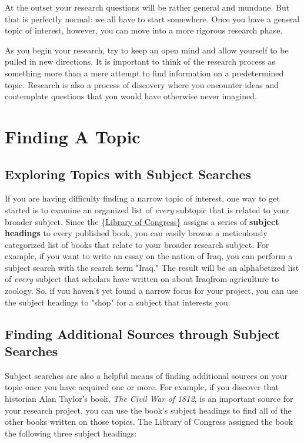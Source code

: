 At the outset your research questions will be rather general and mundane. But 
that is perfectly normal: we all have to start somewhere. Once you have a 
general topic of interest, however, you can move into a more rigorous research 
phase.

As you begin your research, try to keep an open mind and allow yourself to be 
pulled in new directions. It is important to think of the research process as 
something more than a mere attempt to find information on a predetermined 
topic. Research is also a process of discovery where you encounter ideas and 
contemplate questions that you would have otherwise never imagined. 

\section{Finding A Topic}
\subsection{Exploring Topics with Subject Searches}
If you are having difficulty finding a narrow topic of interest, one way to get 
started is to examine an organized list of \emph{every} subtopic that is 
related to your broader subject. Since the 
\href{http://catalog.loc.gov}{\{Library of Congress\}} assigns a series of 
\textbf{subject headings} to every published book, you can easily browse a 
meticulously categorized list of books that relate to your broader research 
subject. For example, if you want to write an essay on the nation of Iraq, you 
can perform a subject search with the search term "Iraq." The result will be an 
alphabetized list of \emph{every} subject that scholars have written on about 
Iraq\textemdash from agriculture to zoology. So, if you haven't yet found a 
narrow focus for your project, you can use the subject headings to "shop" for a 
subject that interests you. 

\subsection{Finding Additional Sources through Subject Searches}
Subject searches are also a helpful means of finding additional sources on your 
topic once you have acquired one or more. For example, if you discover that 
historian Alan Taylor's book, \emph{The Civil War of 1812}, is an important 
source for your research project, you can use the book's subject headings to 
find all of the other books written on those topics. The Library of Congress 
assigned the book the following three subject headings:

